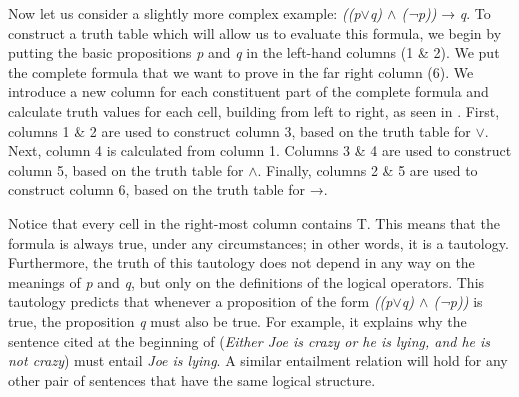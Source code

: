 Now let us consider a slightly more complex example: \textit{((p$\vee$q) $\wedge$ (¬p))} → \textit{q}. To construct a truth table which will allow us to evaluate this formula, we begin by putting the basic propositions \textit{p} and \textit{q} in the left-hand columns (1 \& 2). We put the complete formula that we want to prove in the far right column (6). We introduce a new column for each constituent part of the complete formula and calculate truth values for each cell, building from left to right, as seen in . First, columns 1 \& 2 are used to construct column 3, based on the truth table for \textit{$\vee$}. Next, column 4 is calculated from column 1. Columns 3 \& 4 are used to construct column 5, based on the truth table for \textit{$\wedge$}. Finally, columns 2 \& 5 are used to construct column 6, based on the truth table for →.



Notice that every cell in the right-most column contains T. This means that the formula is always true, under any circumstances; in other words, it is a tautology. Furthermore, the truth of this tautology does not depend in any way on the meanings of \textit{p} and \textit{q}, but only on the definitions of the logical operators. This tautology predicts that whenever a proposition of the form \textit{((p$\vee$q) $\wedge$ (¬p))} is true, the proposition \textit{q} must also be true. For example, it explains why the sentence cited at the beginning of  (\textit{Either Joe is crazy or he is lying, and he is not crazy}) must entail \textit{Joe is lying}. A similar entailment relation will hold for any other pair of sentences that have the same logical structure.

